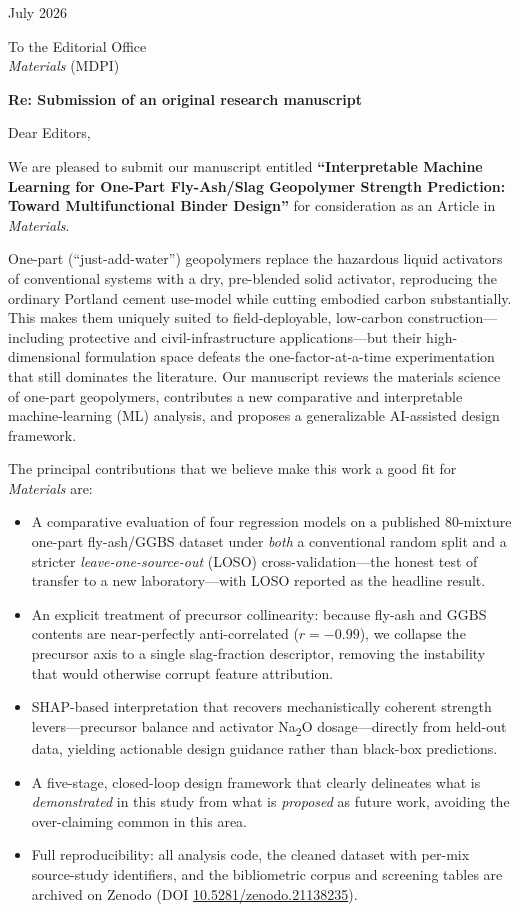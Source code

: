 \documentclass[10pt]{article}
\begin{document}
 July 2026

\vspace{4pt}
\noindent To the Editorial Office\\
\emph{Materials} (MDPI)

\vspace{10pt}
\noindent \textbf{Re: Submission of an original research manuscript}

\vspace{6pt}
\noindent Dear Editors,

We are pleased to submit our manuscript entitled \textbf{``Interpretable Machine
Learning for One-Part Fly-Ash/Slag Geopolymer Strength Prediction: Toward
Multifunctional Binder Design''} for consideration as an Article in \emph{Materials}.

One-part (``just-add-water'') geopolymers replace the hazardous liquid activators of
conventional systems with a dry, pre-blended solid activator, reproducing the ordinary
Portland cement use-model while cutting embodied carbon substantially. This makes them
uniquely suited to field-deployable, low-carbon construction---including protective and
civil-infrastructure applications---but their high-dimensional formulation space defeats
the one-factor-at-a-time experimentation that still dominates the literature. Our
manuscript reviews the materials science of one-part geopolymers, contributes a new
comparative and interpretable machine-learning (ML) analysis, and proposes a
generalizable AI-assisted design framework.

The principal contributions that we believe make this work a good fit for \emph{Materials}
are:

\begin{itemize}
\item A comparative evaluation of four regression models on a published 80-mixture
one-part fly-ash/GGBS dataset under \emph{both} a conventional random split and a
stricter \emph{leave-one-source-out} (LOSO) cross-validation---the honest test of transfer
to a new laboratory---with LOSO reported as the headline result.
\item An explicit treatment of precursor collinearity: because fly-ash and GGBS contents
are near-perfectly anti-correlated ($r=-0.99$), we collapse the precursor axis to a single
slag-fraction descriptor, removing the instability that would otherwise corrupt feature
attribution.
\item SHAP-based interpretation that recovers mechanistically coherent strength
levers---precursor balance and activator Na\textsubscript{2}O dosage---directly from held-out
data, yielding actionable design guidance rather than black-box predictions.
\item A five-stage, closed-loop design framework that clearly delineates what is
\emph{demonstrated} in this study from what is \emph{proposed} as future work, avoiding the
over-claiming common in this area.
\item Full reproducibility: all analysis code, the cleaned dataset with per-mix
source-study identifiers, and the bibliometric corpus and screening tables are archived on
Zenodo (DOI \href{https://doi.org/10.5281/zenodo.21138235}{10.5281/zenodo.21138235}).
\end{itemize}
\end{document}
